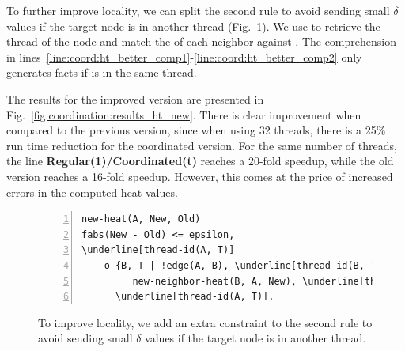 To further improve locality, we can split the second rule to avoid sending small
$\delta$ values if the target node is in another thread
(Fig.~\ref{code:coord:ht_better}). We use  to retrieve the
thread  of the node  and match the  of each
neighbor  against . The comprehension in
lines~\ref{line:coord:ht_better_comp1}-\ref{line:coord:ht_better_comp2} only
generates  facts if  is in the same thread.

The results for the improved version are presented in
Fig.~\ref{fig:coordination:results_ht_new}. There is clear improvement when
compared to the previous version, since when using 32 threads, there is a 25\%
run time reduction for the coordinated version. For the same number of threads,
the line \textbf{Regular(1)/Coordinated(t)} reaches a 20-fold speedup, while the
old version reaches a 16-fold speedup. However, this comes at the price of
increased errors in the computed heat values.

\begin{figure}[h!]
\begin{Verbatim}[numbers=left,fontsize=\codesize,commandchars=\\\[\]]
new-heat(A, New, Old)
fabs(New - Old) <= epsilon,
\underline[thread-id(A, T)]
   -o {B, T | !edge(A, B), \underline[thread-id(B, T)] -o\label[line:coord:ht_better_comp1]
         new-neighbor-heat(B, A, New), \underline[thread-id(B, T)]},\label[line:coord:ht_better_comp2]
      \underline[thread-id(A, T)].
\end{Verbatim}

  \caption{To improve locality, we add an extra constraint to the second rule to
     avoid sending small $\delta$ values if the target node is in another thread.}
  \label{code:coord:ht_better}
\end{figure}

